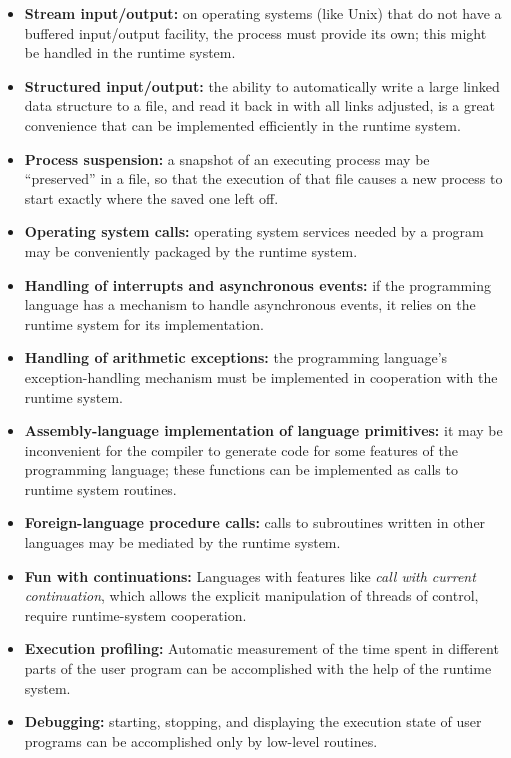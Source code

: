 \begin{itemize}
\item {\bf Stream input/output:} on operating systems (like Unix) that do not
have a buffered input/output facility, the process must provide its own;
this might be handled in the runtime system.
\item {\bf Structured input/output:} the ability to automatically
write a large linked data structure to a file, and read it back in
with all links adjusted, is a great convenience that can be implemented
efficiently in the runtime system.
\item {\bf Process suspension:} a snapshot of an
executing process may be ``preserved'' in a file, so that
the execution of that file causes a new process to start exactly
where the saved one left off.
\item {\bf Operating system calls:} operating system services needed by
a program may be conveniently packaged by the runtime system.
\item {\bf Handling of interrupts and asynchronous events:} if the programming
language has a mechanism to handle asynchronous events, it relies on the
runtime system for its implementation.
\item {\bf Handling of arithmetic exceptions:} the programming language's
exception-handling mechanism must be implemented in cooperation with
the runtime system.
\item {\bf Assembly-language implementation of language primitives:}
it may be inconvenient for the compiler to generate code for some features
of the programming language; these functions can be implemented as calls
to runtime system routines.
\item {\bf Foreign-language procedure calls:} calls to subroutines written
in other languages may be mediated by the runtime system.
\item {\bf Fun with continuations:} Languages with features like {\em call with
current continuation}, which allows the explicit manipulation of threads
of control, require runtime-system cooperation.
\item {\bf Execution profiling:} Automatic measurement of the time spent in
different parts of the user program can be accomplished with the help of
the runtime system.
\item {\bf Debugging:} starting, stopping, and displaying the execution state
of user programs can be accomplished only by low-level routines.
\end{itemize}


